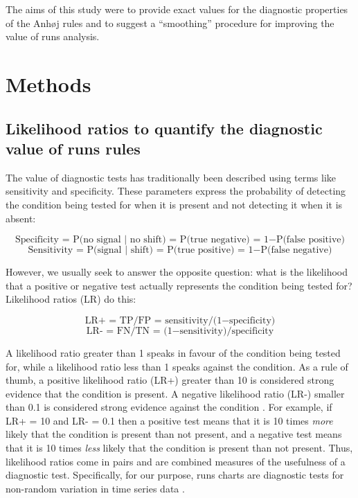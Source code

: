 The aims of this study were to provide exact values for the diagnostic
properties of the Anhøj rules and to suggest a ``smoothing'' procedure
for improving the value of runs analysis.

\hypertarget{methods}{%
\section{Methods}\label{methods}}

\hypertarget{likelihood-ratios-to-quantify-the-diagnostic-value-of-runs-rules}{%
\subsection{Likelihood ratios to quantify the diagnostic value of runs
rules}\label{likelihood-ratios-to-quantify-the-diagnostic-value-of-runs-rules}}

The value of diagnostic tests has traditionally been described using
terms like sensitivity and specificity. These parameters express the
probability of detecting the condition being tested for when it is
present and not detecting it when it is absent:

\[ \text{Specificity = P(no signal | no shift) = P(true negative) = 1} - \text{P(false positive)} \]
\[ \text{Sensitivity = P(signal | shift) = P(true positive) = 1} - \text{P(false negative)} \]

However, we usually seek to answer the opposite question: what is the
likelihood that a positive or negative test actually represents the
condition being tested for? Likelihood ratios (LR) do this:

\[ \text{LR+ = TP/FP = sensitivity/(1} - \text{specificity)} \]
\[ \text{LR- = FN/TN = (1} - \text{sensitivity)/specificity} \]

A likelihood ratio greater than 1 speaks in favour of the condition
being tested for, while a likelihood ratio less than 1 speaks against
the condition. As a rule of thumb, a positive likelihood ratio (LR+)
greater than 10 is considered strong evidence that the condition is
present. A negative likelihood ratio (LR-) smaller than 0.1 is
considered strong evidence against the condition \citep{deeks2004}. For
example, if LR+ = 10 and LR- = 0.1 then a positive test means that it is
10 times \emph{more} likely that the condition is present than not
present, and a negative test means that it is 10 times \emph{less}
likely that the condition is present than not present. Thus, likelihood
ratios come in pairs and are combined measures of the usefulness of a
diagnostic test. Specifically, for our purpose, runs charts are
diagnostic tests for non-random variation in time series data
\citep{anhoej2015, anhoej2018}.

